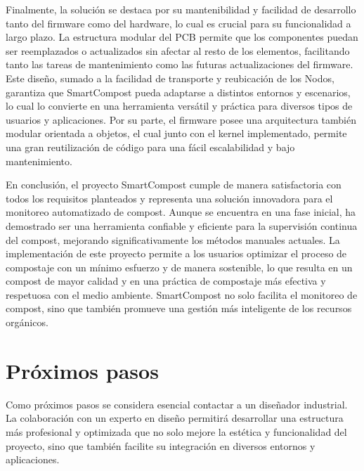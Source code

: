 Finalmente, la solución se destaca por su mantenibilidad y facilidad de desarrollo tanto del firmware como del hardware, lo cual es crucial para su funcionalidad a largo plazo. La estructura modular del PCB permite que los componentes puedan ser reemplazados o actualizados sin afectar al resto de los elementos, facilitando tanto las tareas de mantenimiento como las futuras actualizaciones del firmware. Este diseño, sumado a la facilidad de transporte y reubicación de los Nodos, garantiza que SmartCompost pueda adaptarse a distintos entornos y escenarios, lo cual lo convierte en una herramienta versátil y práctica para diversos tipos de usuarios y aplicaciones.
Por su parte, el firmware posee una arquitectura también modular orientada a objetos, el cual junto con el kernel implementado, permite una gran reutilización de código para una fácil escalabilidad y bajo mantenimiento.

En conclusión, el proyecto SmartCompost cumple de manera satisfactoria con todos los requisitos planteados y representa una solución innovadora para el monitoreo automatizado de compost. Aunque se encuentra en una fase inicial, ha demostrado ser una herramienta confiable y eficiente para la supervisión continua del compost, mejorando significativamente los métodos manuales actuales. La implementación de este proyecto permite a los usuarios optimizar el proceso de compostaje con un mínimo esfuerzo y de manera sostenible, lo que resulta en un compost de mayor calidad y en una práctica de compostaje más efectiva y respetuosa con el medio ambiente. SmartCompost no solo facilita el monitoreo de compost, sino que también promueve una gestión más inteligente de los recursos orgánicos.

\section{Próximos pasos}


Como próximos pasos se considera esencial contactar a un diseñador industrial. La colaboración con un experto en diseño permitirá desarrollar una estructura más profesional y optimizada que no solo mejore la estética y funcionalidad del proyecto, sino que también facilite su integración en diversos entornos y aplicaciones.

